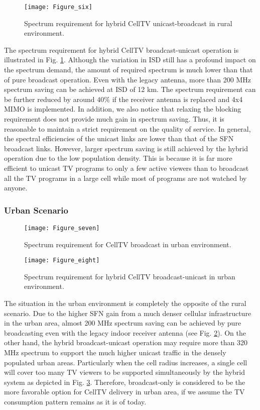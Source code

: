 \documentclass[journal]{IEEEtran}
\begin{document}
   \begin{figure}[t]
  \centering
  \texttt{[image: Figure\_six]}\\
  \caption{Spectrum requirement for hybrid CellTV unicast-broadcast in rural environment.}\label{fig:Hybrid_rural}
\end{figure}
The spectrum requirement for hybrid CellTV broadcast-unicast operation is illustrated in Fig. \ref{fig:Hybrid_rural}. Although the variation in ISD still has a profound impact on the spectrum demand, the amount of required spectrum is much lower than that of pure broadcast operation. Even with the legacy antenna, more than 200 MHz spectrum saving can be achieved at ISD of 12 km. The spectrum requirement can be further reduced by around $40\%$ if the receiver antenna is replaced and 4x4 MIMO is implemented. In addition, we also notice that relaxing the blocking requirement does not provide much gain in spectrum saving. Thus, it is reasonable to maintain a strict requirement on the quality of service. In general, the spectral efficiencies of the unicast links are lower than that of the SFN broadcast links. However, larger spectrum saving is still achieved by the hybrid operation due to the low population density. This is because it is far more efficient to unicast TV programs to only a few active viewers than to broadcast all the TV programs in a large cell while most of programs are not watched by anyone.


\subsubsection{\textbf{Urban Scenario}}
  \begin{figure}[t]
  \centering
  \texttt{[image: Figure\_seven]}\\
  \caption{Spectrum requirement for CellTV broadcast in urban environment.}\label{fig:Broad_urban}
\end{figure}


   \begin{figure}[t]
  \centering
  \texttt{[image: Figure\_eight]}\\
  \caption{Spectrum requirement for hybrid CellTV broadcast-unicast in urban environment.}\label{fig:Hybrid_urban}
\end{figure}

The situation in the urban environment is completely the opposite of the rural scenario. Due to the higher SFN gain from a much denser cellular infrastructure in the urban area, almost 200 MHz spectrum saving can be achieved by pure broadcasting even with the legacy indoor receiver antenna (see Fig. \ref{fig:Broad_urban}). On the other hand, the hybrid broadcast-unicast operation may require more than 320 MHz spectrum to support the much higher unicast traffic in the densely populated urban areas. Particularly when the cell radius increases, a single cell will cover too many TV viewers to be supported simultaneously by the hybrid system as depicted in Fig. \ref{fig:Hybrid_urban}. Therefore, broadcast-only is considered to be the more favorable option for CellTV delivery in urban area, if we assume the TV consumption pattern remains as it is of today.
\end{document}
